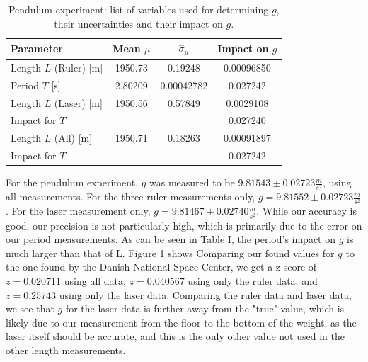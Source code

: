 \documentclass[a4paper,%
               aps,%
               prl,%
               amsfonts,%
               amssymb,%
               amsmath,%
               nobibnotes,%
               twocolumn, %
               twoside,%
               balancelastpage,%
               eqsecnum] %
               {revtex4-1}
\begin{document}
\begin{table}[h]
\caption{Pendulum experiment: list of variables used for determining $g$, their uncertainties and their impact on $g$.}
    \centering
    \begin{tabular}{lccc}
    Parameter & Mean $\mu$ &  $\hat{\sigma}_{\mu}$ &  Impact on $g$ \\\toprule
    Length $L$ (Ruler) [\si{\m}] & \num[round-precision=6,round-mode=figures]{1950.73} & \num[round-precision=5,round-mode=figures]{0.19248} & \num[round-precision=5,round-mode=figures,
     scientific-notation=true]{0.00096850} \\
    Period $T$ [\si{\s}]  & \num[round-precision=6,round-mode=figures]{2.80209} & \num[round-precision=5,round-mode=figures,
     scientific-notation=true]{0.00042782} & \num[round-precision=5,round-mode=figures]{0.027242} \\
    Length $L$ (Laser) [\si{\m}] & \num[round-precision=6,round-mode=figures]{1950.56} & \num[round-precision=5,round-mode=figures]{0.57849} & \num[round-precision=5,round-mode=figures,
     scientific-notation=true]{0.0029108} \\
    Impact for $T$  & \num[round-precision=6,round-mode=figures]{} & \num[round-precision=5,round-mode=figures,
     scientific-notation=true]{} & \num[round-precision=5,round-mode=figures]{0.027240} \\
    Length $L$ (All) [\si{\m}] & \num[round-precision=6,round-mode=figures]{1950.71} & \num[round-precision=5,round-mode=figures]{0.18263} & \num[round-precision=5,round-mode=figures,
     scientific-notation=true]{0.00091897} \\
    Impact for $T$  & \num[round-precision=6,round-mode=figures,
     scientific-notation=true]{} & \num[round-precision=5,round-mode=figures,
     scientific-notation=true]{} & \num[round-precision=5,round-mode=figures]{0.027242} \\
    \end{tabular}
\end{table}

For the pendulum experiment, $g$ was measured to be $9.81543 \pm 0.02723 \frac{m}{s^2}$, using all measurements. For the three ruler measurements only, $g = 9.81552 \pm 0.02723 \frac{m}{s^2}$. For the laser measurement only, $g = 9.81467 \pm 0.02740 \frac{m}{s^2}$. While our accuracy is good, our precision is not particularly high, which is primarily due to the error on our period measurements. As can be seen in Table I, the period's impact on $g$ is much larger than that of L.
Figure 1 shows
Comparing our found values for $g$ to the one found by the Danish National Space Center, we get a z-score of $z = 0.020711$ using all data, $z = 0.040567$ using only the ruler data, and $z = 0.25743$ using only the laser data. Comparing the ruler data and laser data, we see that $g$ for the laser data is further away from the "true" value, which is likely due to our measurement from the floor to the bottom of the weight, as the laser itself should be accurate, and this is the only other value not used in the other length measurements.
\end{document}
